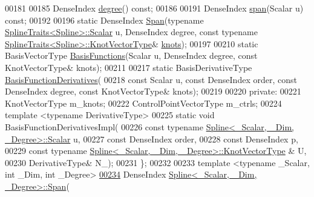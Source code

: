 \begin{DoxyCode}
00181 
00185     DenseIndex \hyperlink{group___splines___module_a0df23e941ac0f31dcd095a4dd4f4a7ec}{degree}() \textcolor{keyword}{const};
00186 
00191     DenseIndex \hyperlink{group___splines___module_ab62751802b4cc237aadb0dbf3455df98}{span}(Scalar u) \textcolor{keyword}{const};
00192 
00196     \textcolor{keyword}{static} DenseIndex \hyperlink{group___splines___module_aaba7632c61b84194e890696c2b57be1b}{Span}(\textcolor{keyword}{typename} \hyperlink{struct_eigen_1_1_spline_traits}{SplineTraits<Spline>::Scalar} u, 
      DenseIndex degree, \textcolor{keyword}{const} \textcolor{keyword}{typename} \hyperlink{struct_eigen_1_1_spline_traits}{SplineTraits<Spline>::KnotVectorType}& 
      \hyperlink{group___splines___module_ae3eac8af580ad880d8ad3a259d453aa1}{knots});
00197     
00210     \textcolor{keyword}{static} BasisVectorType \hyperlink{group___splines___module_a038506788499d71aedddc5211c33bb6e}{BasisFunctions}(Scalar u, DenseIndex degree, \textcolor{keyword}{const} KnotVectorType& 
      knots);
00211 
00217     \textcolor{keyword}{static} BasisDerivativeType \hyperlink{group___splines___module_a2e42e79b08b560007062b8f56689ae24}{BasisFunctionDerivatives}(
00218       \textcolor{keyword}{const} Scalar u, \textcolor{keyword}{const} DenseIndex order, \textcolor{keyword}{const} DenseIndex degree, \textcolor{keyword}{const} KnotVectorType& knots);
00219 
00220   \textcolor{keyword}{private}:
00221     KnotVectorType m\_knots; 
00222     ControlPointVectorType  m\_ctrls; 
00224     \textcolor{keyword}{template} <\textcolor{keyword}{typename} DerivativeType>
00225     \textcolor{keyword}{static} \textcolor{keywordtype}{void} BasisFunctionDerivativesImpl(
00226       \textcolor{keyword}{const} \textcolor{keyword}{typename} \hyperlink{group___splines___module_a8cafd78b564825c76fbb3419653d9742}{Spline<\_Scalar, \_Dim, \_Degree>::Scalar} u,
00227       \textcolor{keyword}{const} DenseIndex order,
00228       \textcolor{keyword}{const} DenseIndex p, 
00229       \textcolor{keyword}{const} \textcolor{keyword}{typename} \hyperlink{group___splines___module_a066f7a8b120316c9068b559f0790e9ec}{Spline<\_Scalar, \_Dim, \_Degree>::KnotVectorType}
      & U,
00230       DerivativeType& N\_);
00231   \};
00232 
00233   \textcolor{keyword}{template} <\textcolor{keyword}{typename} \_Scalar, \textcolor{keywordtype}{int} \_Dim, \textcolor{keywordtype}{int} \_Degree>
\hyperlink{group___splines___module_aaba7632c61b84194e890696c2b57be1b}{00234}   DenseIndex \hyperlink{group___splines___module_aaba7632c61b84194e890696c2b57be1b}{Spline<\_Scalar, \_Dim, \_Degree>::Span}(

\end{DoxyCode}
